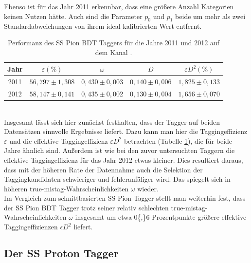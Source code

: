 Ebenso ist für das Jahr \num{2011} erkennbar, dass eine größere Anzahl Kategorien keinen Nutzen hätte. Auch sind die Parameter $p_0$ und $p_1$ beide um mehr als zwei Standardabweichungen von ihrem ideal kalibrierten Wert entfernt.
\begin{table}[htbp]
	\centering
	\caption{Performanz des SS Pion BDT Taggers für die Jahre \num{2011} und \num{2012} auf dem Kanal \BdToDpi.}
	\label{tab:performance_SSPionBDT}
	\begin{tabular}{ccccc}
	\toprule
      Jahr & $\varepsilon(\%)$ & $\omega$ & $D$ & $\varepsilon D^2(\%)$ \\ 
      \midrule
      2011 & $56{,}797\pm1{,}308$& $0{,}430\pm0{,}003$ & $0{,}140\pm0{,}006$ & $1{,}825\pm0{,}133$\\ 
      2012 & $58{,}147\pm0{,}141$& $0{,}435\pm0{,}002$ & $0{,}130\pm0{,}004$ & $1{,}656\pm0{,}070$\\ 
      \bottomrule
	\end{tabular}
\end{table}\\
Insgesamt lässt sich hier zunächst festhalten, dass der Tagger auf beiden Datensätzen sinnvolle Ergebnisse liefert. Dazu kann man hier die Taggingeffizienz $\varepsilon$ und die effektive Taggingeffizienz $\varepsilon D^2$ betrachten (Tabelle \ref{tab:performance_SSPionBDT}), die für beide Jahre ähnlich sind. Außerdem ist wie bei den zuvor untersuchten Taggern die effektive Taggingeffizienz für das Jahr \num{2012} etwas kleiner. Dies resultiert daraus, dass mit der höheren Rate der Datennahme auch die Selektion der Taggingkandidaten schwieriger und fehleranfäliger wird. Das spiegelt sich in höheren true-mistag-Wahrscheinlichkeiten $\omega$ wieder.\\
Im Vergleich zum schnittbasierten SS Pion Tagger stellt man weiterhin fest, dass der SS Pion BDT Tagger trotz seiner relativ schlechten true-mistag-Wahrscheinlichkeiten $\omega$ insgesamt um etwa \num{0{,}6} Prozentpunkte größere effektive Taggingeffizienzen $\epsilon D^2$ liefert. 

\subsection{Der SS Proton Tagger}

